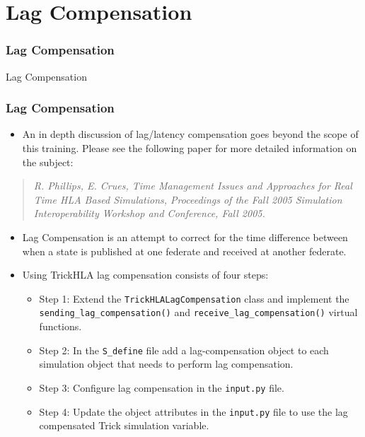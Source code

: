 
   \section{Lag Compensation}

   \begin{frame}
      \frametitle{Lag Compensation}
      \begin{center}
      \Huge{Lag Compensation}
      \end{center}
   \end{frame}
   
   \begin{frame}
      \frametitle{Lag Compensation}
      \begin{itemize}
         \item An in depth discussion of lag/latency compensation goes beyond
         the scope of this training.  Please see the following paper for more
         detailed information on the subject:
      \end{itemize}
         \begin{scriptsize}
         \begin{quote}
         \textit{R. Phillips, E. Crues, Time Management Issues and Approaches
         for Real Time HLA Based Simulations, Proceedings of the Fall 2005
         Simulation Interoperability Workshop and Conference, Fall 2005.}
         \end{quote}
         \end{scriptsize}
      \begin{itemize}
         \item Lag Compensation is an attempt to correct for the time difference
         between when a state is published at one federate and received at
         another federate.
         \item Using TrickHLA lag compensation consists of four steps:
         \begin{itemize}
            \item Step 1: Extend the \texttt{TrickHLALagCompensation} class and
            implement the \texttt{sending\_lag\_compensation()} and
            \texttt{receive\_lag\_compensation()} virtual functions.
            \item Step 2: In the \texttt{S\_define} file add a lag-compensation
            object to each simulation object that needs to perform lag compensation.
            \item Step 3: Configure lag compensation in the \texttt{input.py} file.
            \item Step 4: Update the object attributes in the \texttt{input.py}
            file to use the lag compensated Trick simulation variable.
         \end{itemize}
      \end{itemize}
   \end{frame}

